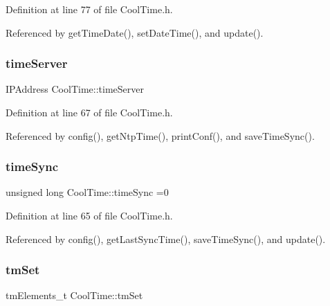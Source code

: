 Definition at line 77 of file Cool\+Time.\+h.



Referenced by get\+Time\+Date(), set\+Date\+Time(), and update().

\mbox{\label{classCoolTime_ad2b9858f399108cb440dd1e908916f04}} 
\subsubsection{\texorpdfstring{time\+Server}{timeServer}}
{\footnotesize\ttfamily I\+P\+Address Cool\+Time\+::time\+Server\hspace{0.3cm}{\ttfamily [private]}}



Definition at line 67 of file Cool\+Time.\+h.



Referenced by config(), get\+Ntp\+Time(), print\+Conf(), and save\+Time\+Sync().

\mbox{\label{classCoolTime_a9d032e76c3470a15b3bbbc52af6463f7}} 
\subsubsection{\texorpdfstring{time\+Sync}{timeSync}}
{\footnotesize\ttfamily unsigned long Cool\+Time\+::time\+Sync =0\hspace{0.3cm}{\ttfamily [private]}}



Definition at line 65 of file Cool\+Time.\+h.



Referenced by config(), get\+Last\+Sync\+Time(), save\+Time\+Sync(), and update().

\mbox{\label{classCoolTime_ad33c2713c903ff064ad09c46406ae088}} 
\subsubsection{\texorpdfstring{tm\+Set}{tmSet}}
{\footnotesize\ttfamily tm\+Elements\+\_\+t Cool\+Time\+::tm\+Set\hspace{0.3cm}{\ttfamily [private]}}




